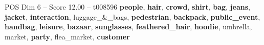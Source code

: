 \begin{textsample}{POS Dim 6 – Score 12.00 – t008596}  \label{ex:f6_pos_037}
\textbf{people}, \textbf{hair}, \textbf{crowd}, \textbf{shirt}, \textbf{bag}, \textbf{jeans}, \textbf{jacket}, \textbf{interaction}, luggage\_\&\_bags, \textbf{pedestrian}, \textbf{backpack}, \textbf{public\_event}, \textbf{handbag}, \textbf{leisure}, \textbf{bazaar}, \textbf{sunglasses}, \textbf{feathered\_hair}, \textbf{hoodie}, umbrella, market, \textbf{party}, flea\_market, \textbf{customer}

\end{textsample}
